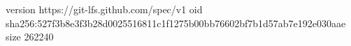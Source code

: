 version https://git-lfs.github.com/spec/v1
oid sha256:527f3b8e3f3b28d0025516811c1f1275b00bb76602bf7b1d57ab7e192e030aae
size 262240
